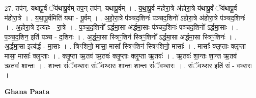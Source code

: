 \documentclass[17pt]{extarticle}
\begin{document}
27. तप॑न्. यथापू॒र्वं ॅय॑थापू॒र्वम् तप॒न् तप॑न्. यथापू॒र्वम् । . य॒था॒पू॒र्व म॑होरा॒त्रे अ॑होरा॒त्रे य॑थापू॒र्वं ॅय॑थापू॒र्व म॑होरा॒त्रे । . य॒था॒पू॒र्वमिति॑ यथा - पू॒र्वम् । . अ॒हो॒रा॒त्रे प॑ञ्चद॒शिनः॑ पञ्चद॒शिनो॑ ऽहोरा॒त्रे अ॑होरा॒त्रे प॑ञ्चद॒शिनः॑ । . अ॒हो॒रा॒त्रे इत्य॑हः - रा॒त्रे । . प॒ञ्च॒द॒शिनो᳚ ऽर्द्धमा॒सा अ॑र्द्धमा॒साः प॑ञ्चद॒शिनः॑ पञ्चद॒शिनो᳚ ऽर्द्धमा॒साः । . प॒ञ्च॒द॒शिन॒ इति॑ पञ्च - द॒शिनः॑ । . अ॒र्द्ध॒मा॒सा स्त्रिꣳ॒॒शिन॑ स्त्रिꣳ॒॒शिनो᳚ ऽर्द्धमा॒सा अ॑र्द्धमा॒सा स्त्रिꣳ॒॒शिनः॑ । . अ॒र्द्ध॒मा॒सा इत्य॑र्द्ध - मा॒साः । . त्रिꣳ॒॒शिनो॒ मासा॒ मासा᳚ स्त्रिꣳ॒॒शिन॑ स्त्रिꣳ॒॒शिनो॒ मासाः᳚ । . मासाः᳚ क्लृ॒प्ताः क्लृ॒प्ता मासा॒ मासाः᳚ क्लृ॒प्ताः । . क्लृ॒प्ता ऋ॒तव॑ ऋ॒तवः॑ क्लृ॒प्ताः क्लृ॒प्ता ऋ॒तवः॑ । . ऋ॒तवः॑ शा॒न्तः शा॒न्त ऋ॒तव॑ ऋ॒तवः॑ शा॒न्तः । . शा॒न्तः सं॑ॅवथ्स॒रः सं॑ॅवथ्स॒रः शा॒न्तः शा॒न्तः सं॑ॅवथ्स॒रः । . सं॒ॅव॒थ्स॒र इति॑ सं - व॒थ्स॒रः । \newline

\textbf{Ghana Paata } \newline
\end{document}
